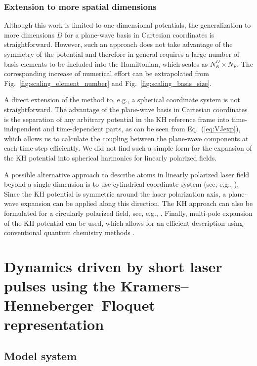 \documentclass[
pra%
,preprint%
,amssymb, nobibnotes, aps, superscriptaddress, floatfix]{revtex4}
\begin{document}
\subsubsection{Extension to more spatial dimensions}

Although this work is limited to one-dimensional potentials, the generalization to more dimensions $D$ for a  plane-wave basis in Cartesian coordinates is straightforward. However, such an approach does not take advantage of the symmetry of the potential and therefore in general requires a large number of basis elements to be included into the Hamiltonian, which scales as $N_K^D \times N_F$. The corresponding increase of numerical effort can be extrapolated from Fig.~\ref{fig:scaling_element_number} and  Fig.~\ref{fig:scaling_basis_size}. 

A direct extension of the method to, e.g., a spherical coordinate system is not straightforward. The advantage of the plane-wave basis in Cartesian coordinates is the separation of any arbitrary potential in the KH reference frame into time-independent and time-dependent parts, as can be seen from Eq.~(\ref{eq:VJexp}), which allows us to calculate the coupling between the plane-wave components at each time-step efficiently. 
We did not find such a simple form for the expansion of the KH potential into spherical harmonics for linearly polarized fields. 

A possible alternative approach to describe atoms in linearly polarized laser field beyond a single dimension is to use cylindrical coordinate system (see, e.g., \cite{Pont1990a}). Since the KH potential is symmetric around the laser polarization axis, a plane-wave expansion can be applied along this direction. 
The KH approach can also be formulated for a circularly polarized field, see, e.g., \cite{Pont1990a}.
Finally, multi-pole expansion of the KH potential can be used, which allows for an efficient description using conventional quantum chemistry methods \cite{Atabek1997}. 



%
%
%
\pagebreak
\section{Dynamics driven by short laser pulses using the Kramers--Henneberger--Floquet representation} \label{sec:results}

\subsection{Model system} \label{sec:model}
\end{document}
